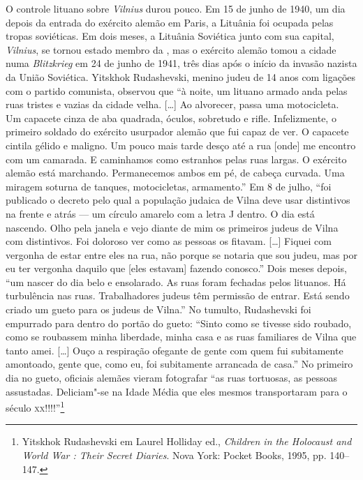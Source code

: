 O controle lituano sobre \textit{Vilnius} durou pouco. Em 15 de junho de 1940, um
dia depois da entrada do exército alemão em Paris, a Lituânia foi
ocupada pelas tropas soviéticas. Em dois meses, a Lituânia Soviética
junto com sua capital, \textit{Vilnius}, se tornou estado membro da , mas o
exército alemão tomou a cidade numa \textit{Blitzkrieg} em 24 de junho de
1941, três dias após o início da invasão nazista da União Soviética.
Yitskhok Rudashevski, menino judeu de 14 anos com ligações com o partido
comunista, observou que ``à noite, um lituano armado anda pelas ruas
tristes e vazias da cidade velha. [\ldots{}] Ao alvorecer, passa uma
motocicleta. Um capacete cinza de aba quadrada, óculos, sobretudo e
rifle. Infelizmente, o primeiro soldado do exército usurpador alemão que
fui capaz de ver. O capacete cintila gélido e maligno. Um pouco mais
tarde desço até a rua {[}onde{]} me encontro com um camarada. E
caminhamos como estranhos pelas ruas largas. O exército alemão está
marchando. Permanecemos ambos em pé, de cabeça curvada. Uma miragem
soturna de tanques, motocicletas, armamento.'' Em 8 de julho, ``foi
publicado o decreto pelo qual a população judaica de Vilna deve usar
distintivos na frente e atrás --- um círculo amarelo com a letra J dentro.
O dia está nascendo. Olho pela janela e vejo diante de mim os primeiros
judeus de Vilna com distintivos. Foi doloroso ver como as pessoas os
fitavam. [\ldots{}] Fiquei com vergonha de estar entre eles na rua, não
porque se notaria que sou judeu, mas por eu ter vergonha daquilo que
{[}eles estavam{]} fazendo conosco.'' Dois meses depois, ``um nascer do
dia belo e ensolarado. As ruas foram fechadas pelos lituanos. Há
turbulência nas ruas. Trabalhadores judeus têm permissão de entrar. Está
sendo criado um gueto para os judeus de Vilna.'' No tumulto, Rudashevski
foi empurrado para dentro do portão do gueto: ``Sinto como se tivesse
sido roubado, como se roubassem minha liberdade, minha casa e as ruas
familiares de Vilna que tanto amei. [\ldots{}] Ouço a respiração ofegante
de gente com quem fui subitamente amontoado, gente que, como eu, foi
subitamente arrancada de casa.'' No primeiro dia no gueto, oficiais
alemães vieram fotografar ``as ruas tortuosas, as pessoas assustadas.
Deliciam"-se na Idade Média que eles mesmos transportaram para o século
\textsc{xx}!!!!''\footnote{Yitskhok Rudashevski em Laurel Holliday ed., \textit{Children in the Holocaust and World War : Their Secret Diaries}. Nova York: Pocket Books, 1995, pp. 140--147.}

